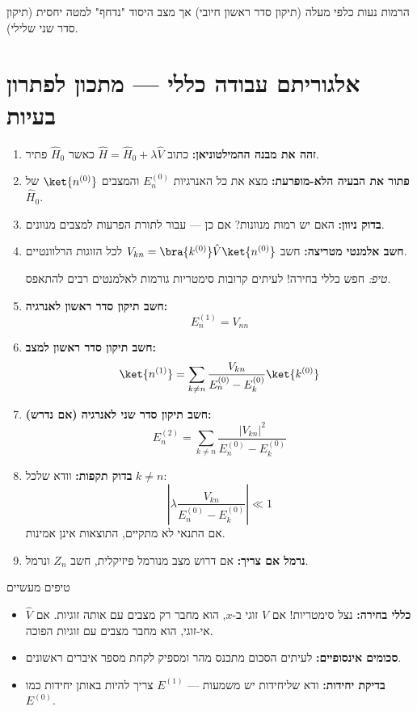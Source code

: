 הרמות נעות כלפי מעלה (תיקון סדר ראשון חיובי) אך מצב היסוד "נדחף" למטה יחסית (תיקון סדר שני שלילי).


\section{אלגוריתם עבודה כללי — מתכון לפתרון בעיות}

\begin{enumerate}
\item \textbf{זהה את מבנה ההמילטוניאן:} כתוב $\hat{H} = \hat{H}_0 + \lambda\hat{V}$ כאשר $\hat{H}_0$ פתיר.

\item \textbf{פתור את הבעיה הלא-מופרעת:} מצא את כל האנרגיות $E_n^{(0)}$ והמצבים $\ket{n^{(0)}}$ של $\hat{H}_0$.

\item \textbf{בדוק ניוון:} האם יש רמות מנוונות? אם כן — עבור לתורת הפרעות למצבים מנוונים.

\item \textbf{חשב אלמנטי מטריצה:} חשב $V_{kn} = \bra{k^{(0)}}\hat{V}\ket{n^{(0)}}$ לכל הזוגות הרלוונטיים.

\textit{טיפ:} חפש כללי בחירה! לעיתים קרובות סימטריות גורמות לאלמנטים רבים להתאפס.

\item \textbf{חשב תיקון סדר ראשון לאנרגיה:}
\[
E_n^{(1)} = V_{nn}
\]

\item \textbf{חשב תיקון סדר ראשון למצב:}
\[
\ket{n^{(1)}} = \sum_{k\neq n}\frac{V_{kn}}{E_n^{(0)}-E_k^{(0)}}\ket{k^{(0)}}
\]

\item \textbf{חשב תיקון סדר שני לאנרגיה (אם נדרש):}
\[
E_n^{(2)} = \sum_{k\neq n}\frac{|V_{kn}|^2}{E_n^{(0)}-E_k^{(0)}}
\]

\item \textbf{בדוק תקפות:} וודא שלכל $k \neq n$:
\[
\left|\lambda\frac{V_{kn}}{E_n^{(0)} - E_k^{(0)}}\right| \ll 1
\]
אם התנאי לא מתקיים, התוצאות אינן אמינות.

\item \textbf{נרמל אם צריך:} אם דרוש מצב מנורמל פיזיקלית, חשב $Z_n$ ונרמל.
\end{enumerate}

\begin{notebox}{טיפים מעשיים}
\begin{itemize}
\item \textbf{כללי בחירה:} נצל סימטריות! אם $\hat{V}$ זוגי ב-$x$, הוא מחבר רק מצבים עם אותה זוגיות. אם $\hat{V}$ אי-זוגי, הוא מחבר מצבים עם זוגיות הפוכה.
\item \textbf{סכומים אינסופיים:} לעיתים הסכום מתכנס מהר ומספיק לקחת מספר איברים ראשונים.
\item \textbf{בדיקת יחידות:} ודא שליחידות יש משמעות — $E^{(1)}$ צריך להיות באותן יחידות כמו $E^{(0)}$.
\end{itemize}
\end{notebox}


